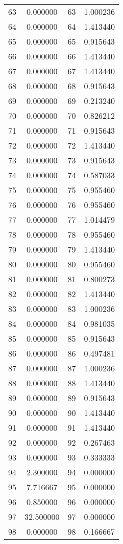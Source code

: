 \documentclass[12pt]{article}
\begin{document}
\begin{longtable}{@{}cccc@{}}
63 & 0.000000 & 63 & 1.000236 \\
64 & 0.000000 & 64 & 1.413440 \\
65 & 0.000000 & 65 & 0.915643 \\
66 & 0.000000 & 66 & 1.413440 \\
67 & 0.000000 & 67 & 1.413440 \\
68 & 0.000000 & 68 & 0.915643 \\
69 & 0.000000 & 69 & 0.213240 \\
70 & 0.000000 & 70 & 0.826212 \\
71 & 0.000000 & 71 & 0.915643 \\
72 & 0.000000 & 72 & 1.413440 \\
73 & 0.000000 & 73 & 0.915643 \\
74 & 0.000000 & 74 & 0.587033 \\
75 & 0.000000 & 75 & 0.955460 \\
76 & 0.000000 & 76 & 0.955460 \\
77 & 0.000000 & 77 & 1.014479 \\
78 & 0.000000 & 78 & 0.955460 \\
79 & 0.000000 & 79 & 1.413440 \\
80 & 0.000000 & 80 & 0.955460 \\
81 & 0.000000 & 81 & 0.800273 \\
82 & 0.000000 & 82 & 1.413440 \\
83 & 0.000000 & 83 & 1.000236 \\
84 & 0.000000 & 84 & 0.981035 \\
85 & 0.000000 & 85 & 0.915643 \\
86 & 0.000000 & 86 & 0.497481 \\
87 & 0.000000 & 87 & 1.000236 \\
88 & 0.000000 & 88 & 1.413440 \\
89 & 0.000000 & 89 & 0.915643 \\
90 & 0.000000 & 90 & 1.413440 \\
91 & 0.000000 & 91 & 1.413440 \\
92 & 0.000000 & 92 & 0.267463 \\
93 & 0.000000 & 93 & 0.333333 \\
94 & 2.300000 & 94 & 0.000000 \\
95 & 7.716667 & 95 & 0.000000 \\
96 & 0.850000 & 96 & 0.000000 \\
97 & 32.500000 & 97 & 0.000000 \\
98 & 0.000000 & 98 & 0.166667 \\

\end{longtable}
\end{document}
